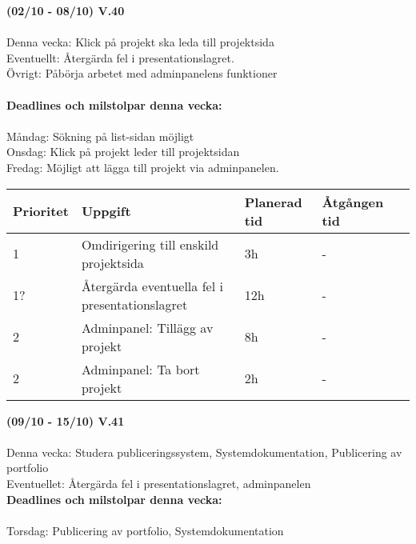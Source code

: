 \documentclass{TDP003mall}
\begin{document}
\hrulefill
\pagebreak
  
\textbf{(02/10 - 08/10) V.40}\\\\
Denna vecka: Klick på projekt ska leda till projektsida\\
Eventuellt: Återgärda fel i presentationslagret.\\
Övrigt: Påbörja arbetet med adminpanelens funktioner\\\\
\textbf{Deadlines och milstolpar denna vecka: }\\\\
Måndag: Sökning på list-sidan möjligt\\
Onsdag: Klick på projekt leder till projektsidan\\
Fredag: Möjligt att lägga till projekt via adminpanelen.\\


\begin{table}[]
\begin{tabular}{|l|l|l|l|l|}
\hline
 Prioritet & Uppgift                    & Planerad tid & Åtgången tid \\ \hline
 1         & Omdirigering till enskild projektsida & 3h           & -       \\ \hline
 1?        & Återgärda eventuella fel i presentationslagret & 12h          & -          \\ \hline
 2         & Adminpanel: Tillägg av projekt& 8h           & -       \\ \hline
 2         & Adminpanel: Ta bort projekt& 2h           & -       \\ \hline
\end{tabular}
\end{table}

\vspace{3em}

\textbf{(09/10 - 15/10) V.41}\\\\
Denna vecka: Studera publiceringssystem, Systemdokumentation, Publicering av portfolio\\
Eventuellet: Återgärda fel  i presentationslagret, adminpanelen\\

\textbf{Deadlines och milstolpar denna vecka: }\\\\
Torsdag: Publicering av portfolio, Systemdokumentation
\end{document}
